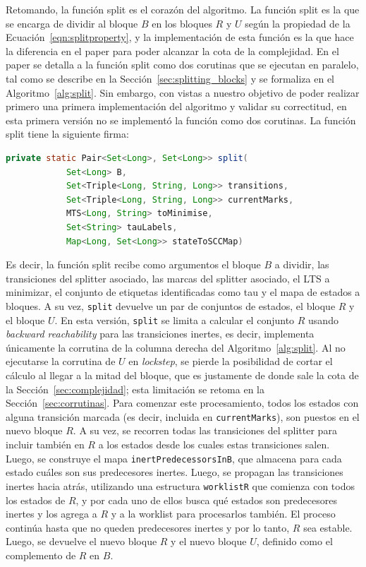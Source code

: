 Retomando, la función split es el corazón del algoritmo. La función split es la que se encarga de dividir al bloque $B$ en los bloques $R$ y $U$ según la propiedad de la Ecuación~\eqref{eqn:splitproperty}, y la implementación de esta función es la que hace la diferencia en el paper para poder alcanzar la cota de la complejidad. En el paper se detalla a la función split como dos corutinas que se ejecutan en paralelo, tal como se describe en la Sección~\ref{sec:splitting_blocks} y se formaliza en el Algoritmo~\ref{alg:split}. Sin embargo, con vistas a nuestro objetivo de poder realizar primero una primera implementación del algoritmo y validar su correctitud, en esta primera versión no se implementó la función como dos corutinas. La función split tiene la siguiente firma: 

\begin{lstlisting}[language=Java, numbers=none]                                
      private static Pair<Set<Long>, Set<Long>> split(
            Set<Long> B,
            Set<Triple<Long, String, Long>> transitions,
            Set<Triple<Long, String, Long>> currentMarks,
            MTS<Long, String> toMinimise,
            Set<String> tauLabels,
            Map<Long, Set<Long>> stateToSCCMap)
\end{lstlisting}   

Es decir, la función split recibe como argumentos el bloque $B$ a dividir, las transiciones del splitter asociado, las marcas del splitter asociado, el LTS a minimizar, el conjunto de etiquetas identificadas como tau y el mapa de estados a bloques. A su vez, \texttt{split} devuelve un par de conjuntos de estados, el bloque $R$ y el bloque $U$. En esta versión, \texttt{split} se limita a calcular el conjunto $R$ usando \textit{backward reachability} para las transiciones inertes, es decir, implementa únicamente la corrutina de la columna derecha del Algoritmo~\ref{alg:split}. Al no ejecutarse la corrutina de $U$ en \textit{lockstep}, se pierde la posibilidad de cortar el cálculo al llegar a la mitad del bloque, que es justamente de donde sale la cota de la Sección~\ref{sec:complejidad}; esta limitación se retoma en la Sección~\ref{sec:corrutinas}. Para comenzar este procesamiento, todos los estados con alguna transición marcada (es decir, incluida en \texttt{currentMarks}), son puestos en el nuevo bloque $R$. A su vez, se recorren todas las transiciones del splitter para incluir también en $R$ a los estados desde los cuales estas transiciones salen. Luego, se construye el mapa \texttt{inertPredecessorsInB}, que almacena para cada estado cuáles son sus predecesores inertes. Luego, se propagan las transiciones inertes hacia atrás, utilizando una estructura \texttt{worklistR} que comienza con todos los estados de $R$, y por cada uno de ellos busca qué estados son predecesores inertes y los agrega a $R$ y a la worklist para procesarlos también. El proceso continúa hasta que no queden predecesores inertes y por lo tanto, $R$ sea estable. Luego, se devuelve el nuevo bloque $R$ y el nuevo bloque $U$, definido como el complemento de $R$ en $B$.

